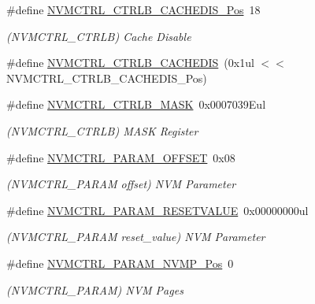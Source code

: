 \begin{DoxyCompactItemize}
\item 
\#define \mbox{\hyperlink{group___s_a_m_d21___n_v_m_c_t_r_l_gaf4c3e69fb60d156a007a7edd11022b55}{N\+V\+M\+C\+T\+R\+L\+\_\+\+C\+T\+R\+L\+B\+\_\+\+C\+A\+C\+H\+E\+D\+I\+S\+\_\+\+Pos}}~18
\begin{DoxyCompactList}\small\item\em (N\+V\+M\+C\+T\+R\+L\+\_\+\+C\+T\+R\+LB) Cache Disable \end{DoxyCompactList}\item 
\#define \mbox{\hyperlink{group___s_a_m_d21___n_v_m_c_t_r_l_gab1f4105b83a240096ef70c4a9c989907}{N\+V\+M\+C\+T\+R\+L\+\_\+\+C\+T\+R\+L\+B\+\_\+\+C\+A\+C\+H\+E\+D\+IS}}~(0x1ul $<$$<$ N\+V\+M\+C\+T\+R\+L\+\_\+\+C\+T\+R\+L\+B\+\_\+\+C\+A\+C\+H\+E\+D\+I\+S\+\_\+\+Pos)
\item 
\#define \mbox{\hyperlink{group___s_a_m_d21___n_v_m_c_t_r_l_gaaf2272ac3ee696dfe0d222a87bc7cbe1}{N\+V\+M\+C\+T\+R\+L\+\_\+\+C\+T\+R\+L\+B\+\_\+\+M\+A\+SK}}~0x0007039\+Eul
\begin{DoxyCompactList}\small\item\em (N\+V\+M\+C\+T\+R\+L\+\_\+\+C\+T\+R\+LB) M\+A\+SK Register \end{DoxyCompactList}\item 
\#define \mbox{\hyperlink{group___s_a_m_d21___n_v_m_c_t_r_l_ga6624597605fc956079a9818778a34abe}{N\+V\+M\+C\+T\+R\+L\+\_\+\+P\+A\+R\+A\+M\+\_\+\+O\+F\+F\+S\+ET}}~0x08
\begin{DoxyCompactList}\small\item\em (N\+V\+M\+C\+T\+R\+L\+\_\+\+P\+A\+R\+AM offset) N\+VM Parameter \end{DoxyCompactList}\item 
\#define \mbox{\hyperlink{group___s_a_m_d21___n_v_m_c_t_r_l_ga70c3c90bcb2318bb472cc9565751ff04}{N\+V\+M\+C\+T\+R\+L\+\_\+\+P\+A\+R\+A\+M\+\_\+\+R\+E\+S\+E\+T\+V\+A\+L\+UE}}~0x00000000ul
\begin{DoxyCompactList}\small\item\em (N\+V\+M\+C\+T\+R\+L\+\_\+\+P\+A\+R\+AM reset\+\_\+value) N\+VM Parameter \end{DoxyCompactList}\item 
\#define \mbox{\hyperlink{group___s_a_m_d21___n_v_m_c_t_r_l_ga08f9f5de86a6c44ce2d6ecdb9f995443}{N\+V\+M\+C\+T\+R\+L\+\_\+\+P\+A\+R\+A\+M\+\_\+\+N\+V\+M\+P\+\_\+\+Pos}}~0
\begin{DoxyCompactList}\small\item\em (N\+V\+M\+C\+T\+R\+L\+\_\+\+P\+A\+R\+AM) N\+VM Pages \end{DoxyCompactList}\item 
$$
\end{DoxyCompactItemize}
